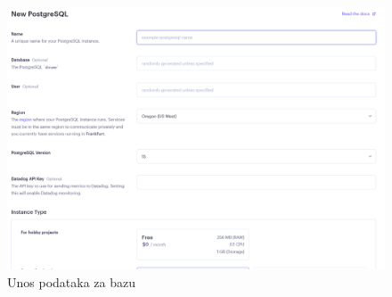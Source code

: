 			\begin{figure}[H]
				\includegraphics[scale=0.40]{slike/render2.png} %
				\centering
				\caption{Unos podataka za bazu}
				\label{fig:Unos podataka za bazu}
			\end{figure}

